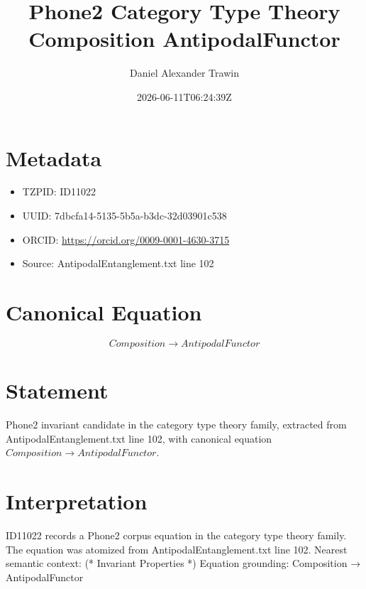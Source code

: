 \documentclass[11pt]{article}
\title{Phone2 Category Type Theory Composition AntipodalFunctor}
\author{Daniel Alexander Trawin}
\date{2026-06-11T06:24:39Z}
\begin{document}
\maketitle
\section*{Metadata}
\begin{itemize}
\item TZPID: ID11022
\item UUID: 7dbcfa14-5135-5b5a-b3dc-32d03901c538
\item ORCID: \url{https://orcid.org/0009-0001-4630-3715}
\item Source: AntipodalEntanglement.txt line 102
\end{itemize}
\section*{Canonical Equation}
\[
Composition → AntipodalFunctor
\]
\section*{Statement}
Phone2 invariant candidate in the category type theory family, extracted from AntipodalEntanglement.txt line 102, with canonical equation $Composition → AntipodalFunctor$.
\section*{Interpretation}
ID11022 records a Phone2 corpus equation in the category type theory family. The equation was atomized from AntipodalEntanglement.txt line 102. Nearest semantic context: (* Invariant Properties *) Equation grounding: Composition → AntipodalFunctor
\end{document}
